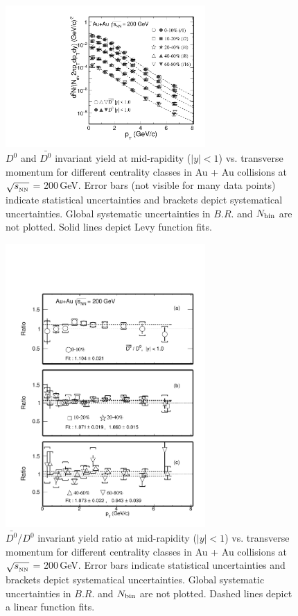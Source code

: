 \begin{figure}
\centering
\includegraphics[width=0.68\textwidth]{figure/Run14_D0HFT/D0_spectra_bothposneg.pdf}
\caption{$D^{0}$ and $\bar{D^{0}}$ invariant yield at mid-rapidity ($|y|<1$) vs. transverse momentum for different centrality classes in Au + Au collisions at $\sqrt{s_{_{\rm NN}}}$ = 200\,GeV. Error bars (not visible for many data points) indicate statistical uncertainties and brackets depict systematical uncertainties. Global systematic uncertainties in $B.R.$ and $N_{\rm bin}$ are not plotted. Solid lines depict Levy function fits.}
\label{D0_spectra_bothposneg} 
\end{figure}

\begin{figure}
\centering
\includegraphics[width=0.68\textwidth]{figure/Run14_D0HFT/D0_spectra_ratioposneg_fit.pdf}
\caption{$\bar{D^{0}}$/$D^{0}$ invariant yield ratio at mid-rapidity ($|y|<1$) vs. transverse momentum for different centrality classes in Au + Au collisions at $\sqrt{s_{_{\rm NN}}}$ = 200\,GeV. Error bars indicate statistical uncertainties and brackets depict systematical uncertainties. Global systematic uncertainties in $B.R.$ and $N_{\rm bin}$ are not plotted. Dashed lines depict a linear function fits.}
\label{D0_spectra_ratioposneg} 
\end{figure}

